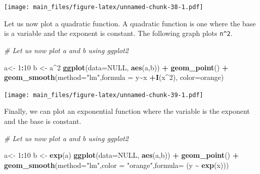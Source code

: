 \documentclass[
]{book}
\newenvironment{Shaded}{\begin{snugshade}}{\end{snugshade}}
\newcommand{\AttributeTok}[1]{\textcolor[rgb]{0.13,0.29,0.53}{#1}}
\newcommand{\CommentTok}[1]{\textcolor[rgb]{0.56,0.35,0.01}{\textit{#1}}}
\newcommand{\ConstantTok}[1]{\textcolor[rgb]{0.56,0.35,0.01}{#1}}
\newcommand{\DecValTok}[1]{\textcolor[rgb]{0.00,0.00,0.81}{#1}}
\newcommand{\FunctionTok}[1]{\textcolor[rgb]{0.13,0.29,0.53}{\textbf{#1}}}
\newcommand{\NormalTok}[1]{#1}
\newcommand{\OtherTok}[1]{\textcolor[rgb]{0.56,0.35,0.01}{#1}}
\newcommand{\SpecialCharTok}[1]{\textcolor[rgb]{0.81,0.36,0.00}{\textbf{#1}}}
\newcommand{\StringTok}[1]{\textcolor[rgb]{0.31,0.60,0.02}{#1}}
\begin{document}
\texttt{[image: main\_files/figure-latex/unnamed-chunk-38-1.pdf]}

Let us now plot a quadratic function. A quadratic function is one where the base is a variable and the exponent is constant. The following graph plots \texttt{n\^{}2}.

\begin{Shaded}
\begin{Highlighting}[]
\CommentTok{\# Let us now plot a and b using ggplot2}

\NormalTok{a}\OtherTok{\textless{}{-}} \DecValTok{1}\SpecialCharTok{:}\DecValTok{10}
\NormalTok{b }\OtherTok{\textless{}{-}}\NormalTok{ a}\SpecialCharTok{\^{}}\DecValTok{2}
\FunctionTok{ggplot}\NormalTok{(}\AttributeTok{data=}\ConstantTok{NULL}\NormalTok{, }\FunctionTok{aes}\NormalTok{(a,b)) }\SpecialCharTok{+}
  \FunctionTok{geom\_point}\NormalTok{() }\SpecialCharTok{+}
  \FunctionTok{geom\_smooth}\NormalTok{(}\AttributeTok{method=}\StringTok{"lm"}\NormalTok{,}\AttributeTok{formula =}\NormalTok{ y}\SpecialCharTok{\textasciitilde{}}\NormalTok{x }\SpecialCharTok{+}\FunctionTok{I}\NormalTok{(x}\SpecialCharTok{\^{}}\DecValTok{2}\NormalTok{), }\AttributeTok{color=}\StringTok{\textquotesingle{}orange\textquotesingle{}}\NormalTok{)}
\end{Highlighting}
\end{Shaded}

\texttt{[image: main\_files/figure-latex/unnamed-chunk-39-1.pdf]}

Finally, we can plot an exponential function where the variable is the exponent and the base is constant.

\begin{Shaded}
\begin{Highlighting}[]
\CommentTok{\# Let us now plot a and b using ggplot2}

\NormalTok{a}\OtherTok{\textless{}{-}} \DecValTok{1}\SpecialCharTok{:}\DecValTok{10}
\NormalTok{b }\OtherTok{\textless{}{-}} \FunctionTok{exp}\NormalTok{(a)}
\FunctionTok{ggplot}\NormalTok{(}\AttributeTok{data=}\ConstantTok{NULL}\NormalTok{, }\FunctionTok{aes}\NormalTok{(a,b)) }\SpecialCharTok{+}
  \FunctionTok{geom\_point}\NormalTok{() }\SpecialCharTok{+}
  \FunctionTok{geom\_smooth}\NormalTok{(}\AttributeTok{method=}\StringTok{"lm"}\NormalTok{,}\AttributeTok{color =} \StringTok{"orange"}\NormalTok{,}\AttributeTok{formula=}\NormalTok{ (y }\SpecialCharTok{\textasciitilde{}} \FunctionTok{exp}\NormalTok{(x)))}
\end{Highlighting}
\end{Shaded}
\end{document}
